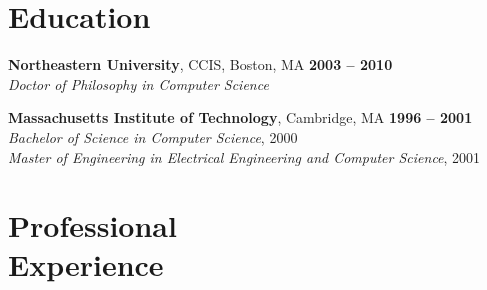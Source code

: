 \documentclass[margin,line,draft]{res}
\def\noneed#1{}
\def\coursetitle#1{\textsl{#1}}
\newcommand{\mysidestyle}{\sc}
\begin{document}
\begin{resume}
    \section{\mysidestyle Education}

    \textbf{Northeastern University}, CCIS, Boston, MA \hfill \textbf{ 2003 -- 2010}\\%
    \textsl{Doctor of Philosophy in Computer Science} \vspace{-2mm}\\\vspace{-2mm}%

    \textbf{Massachusetts Institute of Technology}, Cambridge, MA \hfill \textbf{1996 --  2001}\\%
    \textsl{Bachelor of Science in Computer Science}, 2000 \\\vspace{-2mm}%
    \textsl{Master of Engineering in Electrical Engineering and Computer Science}, 2001 \vspace{-2mm}\\%
     \noneed{\vspace{-4mm}Received letters of commendation for performance in 
     two courses: 
     6.004: \coursetitle{Computation Structures}, and 
     6.170: \coursetitle{Laboratory in Software Engineering}.}

    \section{\mysidestyle Professional\\Experience}


\end{resume}
\end{document}
